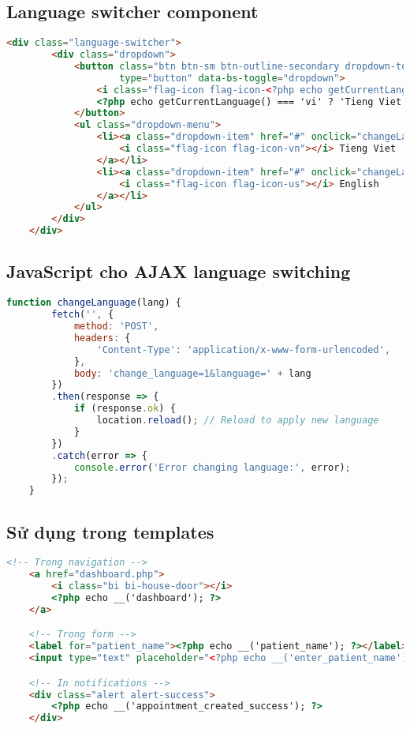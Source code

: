 \documentclass[12pt,a4paper]{report}
\begin{document}
    \subsection{Language switcher component}
    \begin{lstlisting}[language=HTML, caption=Language switcher component]
    <div class="language-switcher">
        <div class="dropdown">
            <button class="btn btn-sm btn-outline-secondary dropdown-toggle" 
                    type="button" data-bs-toggle="dropdown">
                <i class="flag-icon flag-icon-<?php echo getCurrentLanguage() === 'vi' ? 'vn' : 'us'; ?>"></i>
                <?php echo getCurrentLanguage() === 'vi' ? 'Tieng Viet' : 'English'; ?>
            </button>
            <ul class="dropdown-menu">
                <li><a class="dropdown-item" href="#" onclick="changeLanguage('vi')">
                    <i class="flag-icon flag-icon-vn"></i> Tieng Viet
                </a></li>
                <li><a class="dropdown-item" href="#" onclick="changeLanguage('en')">
                    <i class="flag-icon flag-icon-us"></i> English  
                </a></li>
            </ul>
        </div>
    </div>
    \end{lstlisting}

    \subsection{JavaScript cho AJAX language switching}
    \begin{lstlisting}[language=JavaScript, caption=AJAX language switching]
    function changeLanguage(lang) {
        fetch('', {
            method: 'POST',
            headers: {
                'Content-Type': 'application/x-www-form-urlencoded',
            },
            body: 'change_language=1&language=' + lang
        })
        .then(response => {
            if (response.ok) {
                location.reload(); // Reload to apply new language
            }
        })
        .catch(error => {
            console.error('Error changing language:', error);
        });
    }
    \end{lstlisting}

    \subsection{Sử dụng trong templates}
    \begin{lstlisting}[language=HTML, caption=Usage in templates]
    <!-- Trong navigation -->
    <a href="dashboard.php">
        <i class="bi bi-house-door"></i>
        <?php echo __('dashboard'); ?>
    </a>

    <!-- Trong form -->
    <label for="patient_name"><?php echo __('patient_name'); ?></label>
    <input type="text" placeholder="<?php echo __('enter_patient_name'); ?>">

    <!-- In notifications -->
    <div class="alert alert-success">
        <?php echo __('appointment_created_success'); ?>
    </div>
    \end{lstlisting}
\end{document}
